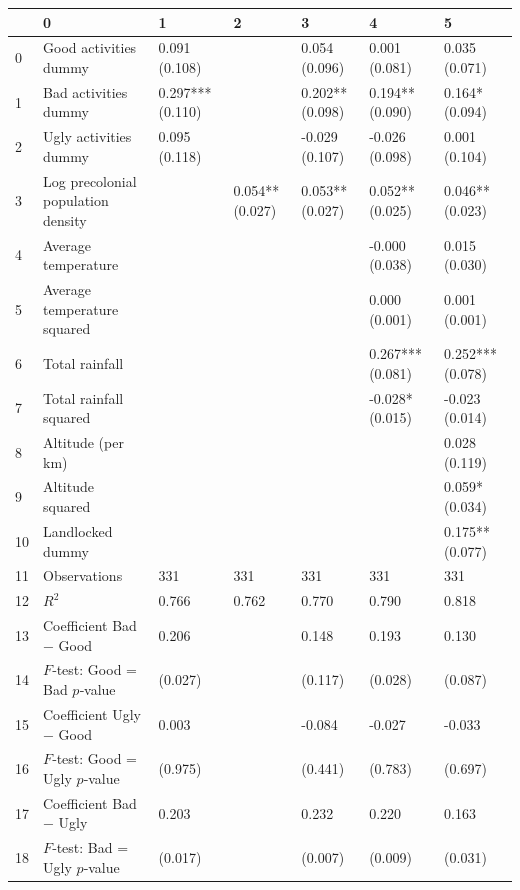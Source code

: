 \begin{tabular}{lllllll}
\toprule
 & 0 & 1 & 2 & 3 & 4 & 5 \\
\midrule
0 & Good activities dummy & 0.091
(0.108) &  & 0.054
(0.096) & 0.001
(0.081) & 0.035
(0.071) \\
1 & Bad activities dummy & 0.297***
(0.110) &  & 0.202**
(0.098) & 0.194**
(0.090) & 0.164*
(0.094) \\
2 & Ugly activities dummy & 0.095
(0.118) &  & -0.029
(0.107) & -0.026
(0.098) & 0.001
(0.104) \\
3 & Log precolonial population density &  & 0.054**
(0.027) & 0.053**
(0.027) & 0.052**
(0.025) & 0.046**
(0.023) \\
4 & Average temperature &  &  &  & -0.000
(0.038) & 0.015
(0.030) \\
5 & Average temperature squared &  &  &  & 0.000
(0.001) & 0.001
(0.001) \\
6 & Total rainfall &  &  &  & 0.267***
(0.081) & 0.252***
(0.078) \\
7 & Total rainfall squared &  &  &  & -0.028*
(0.015) & -0.023
(0.014) \\
8 & Altitude (per km) &  &  &  &  & 0.028
(0.119) \\
9 & Altitude squared &  &  &  &  & 0.059*
(0.034) \\
10 & Landlocked dummy &  &  &  &  & 0.175**
(0.077) \\
11 & Observations & 331 & 331 & 331 & 331 & 331 \\
12 & $R^2$ & 0.766 & 0.762 & 0.770 & 0.790 & 0.818 \\
13 & Coefficient Bad − Good & 0.206 &  & 0.148 & 0.193 & 0.130 \\
14 & $F$‑test: Good = Bad $p$‑value & (0.027) &  & (0.117) & (0.028) & (0.087) \\
15 & Coefficient Ugly − Good & 0.003 &  & -0.084 & -0.027 & -0.033 \\
16 & $F$‑test: Good = Ugly $p$‑value & (0.975) &  & (0.441) & (0.783) & (0.697) \\
17 & Coefficient Bad − Ugly & 0.203 &  & 0.232 & 0.220 & 0.163 \\
18 & $F$‑test: Bad = Ugly $p$‑value & (0.017) &  & (0.007) & (0.009) & (0.031) \\
\bottomrule
\end{tabular}
